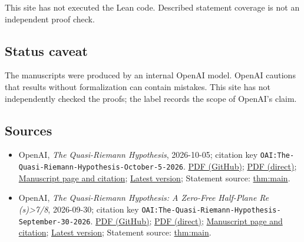 \documentclass[11pt]{article}
\begin{document}
This site has not executed the Lean code. Described statement coverage is not an independent proof check.

\subsection{Status caveat}
The manuscripts were produced by an internal OpenAI model. OpenAI cautions that results without formalization can contain mistakes. This site has not independently checked the proofs; the label records the scope of OpenAI's claim.

\subsection{Sources}
\begin{itemize}
\item OpenAI, \emph{The Quasi-Riemann Hypothesis}, 2026-10-05; citation key \texttt{OAI:The-Quasi-Riemann-Hypothesis-October-5-2026}. \href{https://github.com/openai/math/blob/adc7f1241b42e322a6451854ab7e4b4c146bf78a/preprints/The-Quasi-Riemann-Hypothesis-October-5-2026/paper2.pdf}{PDF (GitHub)}; \href{https://github.com/openai/math/raw/adc7f1241b42e322a6451854ab7e4b4c146bf78a/preprints/The-Quasi-Riemann-Hypothesis-October-5-2026/paper2.pdf}{PDF (direct)}; \href{https://github.com/openai/math/blob/adc7f1241b42e322a6451854ab7e4b4c146bf78a/preprints/The-Quasi-Riemann-Hypothesis-October-5-2026/README.md}{Manuscript page and citation}; \href{https://github.com/openai/math/blob/main/preprints/The-Quasi-Riemann-Hypothesis-October-5-2026/paper2.pdf}{Latest version}; Statement source: \href{https://github.com/openai/math/blob/adc7f1241b42e322a6451854ab7e4b4c146bf78a/preprints/The-Quasi-Riemann-Hypothesis-October-5-2026/build/paper2.tex\#L73}{thm:main}.
\item OpenAI, \emph{The Quasi-Riemann Hypothesis: A Zero-Free Half-Plane Re (s)>7/8}, 2026-09-30; citation key \texttt{OAI:The-Quasi-Riemann-Hypothesis-September-30-2026}. \href{https://github.com/openai/math/blob/adc7f1241b42e322a6451854ab7e4b4c146bf78a/preprints/The-Quasi-Riemann-Hypothesis-September-30-2026/paper.pdf}{PDF (GitHub)}; \href{https://github.com/openai/math/raw/adc7f1241b42e322a6451854ab7e4b4c146bf78a/preprints/The-Quasi-Riemann-Hypothesis-September-30-2026/paper.pdf}{PDF (direct)}; \href{https://github.com/openai/math/blob/adc7f1241b42e322a6451854ab7e4b4c146bf78a/preprints/The-Quasi-Riemann-Hypothesis-September-30-2026/README.md}{Manuscript page and citation}; \href{https://github.com/openai/math/blob/main/preprints/The-Quasi-Riemann-Hypothesis-September-30-2026/paper.pdf}{Latest version}; Statement source: \href{https://github.com/openai/math/blob/adc7f1241b42e322a6451854ab7e4b4c146bf78a/preprints/The-Quasi-Riemann-Hypothesis-September-30-2026/build/paper.tex\#L106}{thm:main}.

\end{itemize}
\end{document}
